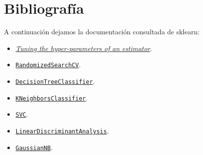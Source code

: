 \documentclass[10pt,a4paper]{article}
\begin{document}
\section{Bibliografía}
A continuación dejamos la documentación consultada de sklearn:
\begin{itemize}
    \itemsep0em
    \item \href{https://scikit-learn.org/stable/modules/grid_search.html}{\textit{Tuning the hyper-parameters of an estimator}}.
    \item \href{https://scikit-learn.org/stable/modules/generated/sklearn.model_selection.RandomizedSearchCV.html}{\texttt{RandomizedSearchCV}}.
    \item \href{https://scikit-learn.org/stable/modules/generated/sklearn.tree.DecisionTreeClassifier.html}{\texttt{DecisionTreeClassifier}}.
    \item \href{https://scikit-learn.org/stable/modules/generated/sklearn.neighbors.KNeighborsClassifier.html}{\texttt{KNeighborsClassifier}}.
    \item \href{https://scikit-learn.org/stable/modules/generated/sklearn.svm.SVC.html}{\texttt{SVC}}.
    \item \href{https://scikit-learn.org/stable/modules/generated/sklearn.discriminant_analysis.LinearDiscriminantAnalysis.html}{\texttt{LinearDiscriminantAnalysis}}.
    \item \href{https://scikit-learn.org/stable/modules/generated/sklearn.naive_bayes.GaussianNB.html}{\texttt{GaussianNB}}.
\end{itemize}
\end{document}
